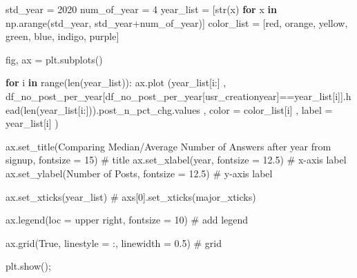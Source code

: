 \documentclass[
  letterpaper,
  DIV=11,
  numbers=noendperiod]{scrartcl}
\newenvironment{Shaded}{\begin{snugshade}}{\end{snugshade}}
\newcommand{\BuiltInTok}[1]{\textcolor[rgb]{0.00,0.23,0.31}{#1}}
\newcommand{\CommentTok}[1]{\textcolor[rgb]{0.37,0.37,0.37}{#1}}
\newcommand{\ControlFlowTok}[1]{\textcolor[rgb]{0.00,0.23,0.31}{\textbf{#1}}}
\newcommand{\DecValTok}[1]{\textcolor[rgb]{0.68,0.00,0.00}{#1}}
\newcommand{\FloatTok}[1]{\textcolor[rgb]{0.68,0.00,0.00}{#1}}
\newcommand{\KeywordTok}[1]{\textcolor[rgb]{0.00,0.23,0.31}{\textbf{#1}}}
\newcommand{\NormalTok}[1]{\textcolor[rgb]{0.00,0.23,0.31}{#1}}
\newcommand{\OperatorTok}[1]{\textcolor[rgb]{0.37,0.37,0.37}{#1}}
\newcommand{\StringTok}[1]{\textcolor[rgb]{0.13,0.47,0.30}{#1}}
\newcommand{\VariableTok}[1]{\textcolor[rgb]{0.07,0.07,0.07}{#1}}
\begin{document}
\begin{Shaded}
\begin{Highlighting}[]
\NormalTok{std\_year }\OperatorTok{=} \DecValTok{2020}
\NormalTok{num\_of\_year }\OperatorTok{=} \DecValTok{4}
\NormalTok{year\_list }\OperatorTok{=}\NormalTok{ [}\BuiltInTok{str}\NormalTok{(x) }\ControlFlowTok{for}\NormalTok{ x }\KeywordTok{in}\NormalTok{ np.arange(std\_year, std\_year}\OperatorTok{+}\NormalTok{num\_of\_year)]}
\NormalTok{color\_list }\OperatorTok{=}\NormalTok{ [}\StringTok{\textquotesingle{}red\textquotesingle{}}\NormalTok{, }\StringTok{\textquotesingle{}orange\textquotesingle{}}\NormalTok{, }\StringTok{\textquotesingle{}yellow\textquotesingle{}}\NormalTok{, }\StringTok{\textquotesingle{}green\textquotesingle{}}\NormalTok{, }\StringTok{\textquotesingle{}blue\textquotesingle{}}\NormalTok{, }\StringTok{\textquotesingle{}indigo\textquotesingle{}}\NormalTok{, }\StringTok{\textquotesingle{}purple\textquotesingle{}}\NormalTok{]}

\NormalTok{fig, ax }\OperatorTok{=}\NormalTok{ plt.subplots()}

\ControlFlowTok{for}\NormalTok{ i }\KeywordTok{in} \BuiltInTok{range}\NormalTok{(}\BuiltInTok{len}\NormalTok{(year\_list)):   }
\NormalTok{        ax.plot (year\_list[i:]}
\NormalTok{        , df\_no\_post\_per\_year[df\_no\_post\_per\_year[}\StringTok{\textquotesingle{}usr\_creationyear\textquotesingle{}}\NormalTok{]}\OperatorTok{==}\NormalTok{year\_list[i]].head(}\BuiltInTok{len}\NormalTok{(year\_list[i:])).post\_n\_pct\_chg.values}
\NormalTok{        ,  color }\OperatorTok{=}\NormalTok{ color\_list[i]}
\NormalTok{        ,  label }\OperatorTok{=}\NormalTok{ year\_list[i]}
\NormalTok{        ) }


\NormalTok{ax.set\_title(}\StringTok{\textquotesingle{}Comparing Median/Average Number of Answers after year from signup\textquotesingle{}}\NormalTok{, fontsize }\OperatorTok{=} \DecValTok{15}\NormalTok{) }\CommentTok{\# title}
\NormalTok{ax.set\_xlabel(}\StringTok{\textquotesingle{}year\textquotesingle{}}\NormalTok{, fontsize }\OperatorTok{=} \FloatTok{12.5}\NormalTok{) }\CommentTok{\# x{-}axis label}
\NormalTok{ax.set\_ylabel(}\StringTok{\textquotesingle{}Number of Posts\textquotesingle{}}\NormalTok{, fontsize }\OperatorTok{=} \FloatTok{12.5}\NormalTok{) }\CommentTok{\# y{-}axis label}

\NormalTok{ax.set\_xticks(year\_list)}
\CommentTok{\# axs[0].set\_xticks(major\_xticks)}

\NormalTok{ax.legend(loc }\OperatorTok{=} \StringTok{\textquotesingle{}upper right\textquotesingle{}}\NormalTok{, fontsize }\OperatorTok{=} \DecValTok{10}\NormalTok{) }\CommentTok{\# add legend}

\NormalTok{ax.grid(}\VariableTok{True}\NormalTok{, linestyle }\OperatorTok{=} \StringTok{\textquotesingle{}:\textquotesingle{}}\NormalTok{, linewidth }\OperatorTok{=} \FloatTok{0.5}\NormalTok{) }\CommentTok{\# grid}

\NormalTok{plt.show()}\OperatorTok{;}
\end{Highlighting}
\end{Shaded}
\end{document}
